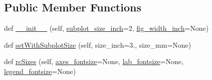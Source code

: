 \subsection*{Public Member Functions}
\begin{DoxyCompactItemize}
\item 
def \mbox{\hyperlink{classgetdist_1_1plots_1_1GetDistPlotSettings_a62fd20fea9f70d85837b5a769aa0025c}{\+\_\+\+\_\+init\+\_\+\+\_\+}} (self, \mbox{\hyperlink{classgetdist_1_1plots_1_1GetDistPlotSettings_a481dfced51f499a2747fee7f406fc91b}{subplot\+\_\+size\+\_\+inch}}=2, \mbox{\hyperlink{classgetdist_1_1plots_1_1GetDistPlotSettings_a81f8a6c1c2d6786381c889a6df53c497}{fig\+\_\+width\+\_\+inch}}=None)
\item 
def \mbox{\hyperlink{classgetdist_1_1plots_1_1GetDistPlotSettings_aa0678c44b75bfe8ab3560374e57cecbe}{set\+With\+Subplot\+Size}} (self, size\+\_\+inch=3., size\+\_\+mm=None)
\item 
def \mbox{\hyperlink{classgetdist_1_1plots_1_1GetDistPlotSettings_a84c44ce0f9d0d11047e20ce8b46cc4fa}{rc\+Sizes}} (self, \mbox{\hyperlink{classgetdist_1_1plots_1_1GetDistPlotSettings_aa49829f628669ac9c8d6499e10ca273a}{axes\+\_\+fontsize}}=None, \mbox{\hyperlink{classgetdist_1_1plots_1_1GetDistPlotSettings_af483cd33194e04c5eaec0da8ae93c23b}{lab\+\_\+fontsize}}=None, \mbox{\hyperlink{classgetdist_1_1plots_1_1GetDistPlotSettings_a055fc979cc8073b6647355e3260a06ed}{legend\+\_\+fontsize}}=None)
\end{DoxyCompactItemize}
